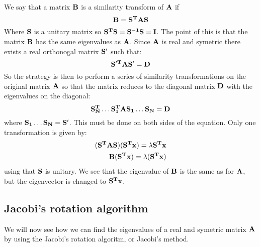 \documentclass[11pt,a4wide]{article}
\begin{document}
We say that a matrix $\bf B$ is a similarity transform of $\bf A$ if 
\[
\bf B = \bf {S^T AS}
\]
Where $\bf S$ is a unitary matrix so $\bf{S^TS} = \bf{S^{-1}S} = \bf I$. The point of this is that the matrix $\bf B$ has the same eigenvalues as $\bf A$. Since $\bf A$ is real and symetric there exists a real orthonogal matrix $\bf S'$ such that: %
\[
\bf {S'^T AS'} = \bf D
\]
So the strategy is then to perform a series of similarity transformations on the original matrix $\bf A$ so that the matrix reduces to the diagonal matrix $\bf D$ with the eigenvalues on the diagonal:
\[
\bf{S_N^T\dots S_1^TAS_1\dots S_N} = \bf D
\]
where $\bf{S_1\dots S_N} = \bf S'$. This must be done on both sides of the equation. Only one transformation is given by:
\begin{align*}
(\bf{S^TAS})(\bf{S^Tx}) = \lambda \bf{S^Tx} \\
\bf{B(S^Tx)} = \lambda\bf{(S^Tx)}
\end{align*}
using that $\bf S$ is unitary. We see that the eigenvalue of $\bf B$ is the same as for $\bf A$, but the eigenvector is changed to $\bf{S^Tx}$.

\subsection{Jacobi's rotation algorithm} \label{sec:jacobi}
We will now see how we can find the eigenvalues of a real and symetric matrix $\bf A$ by using the Jacobi's rotation algoritm, or Jacobi's method.
\end{document}
